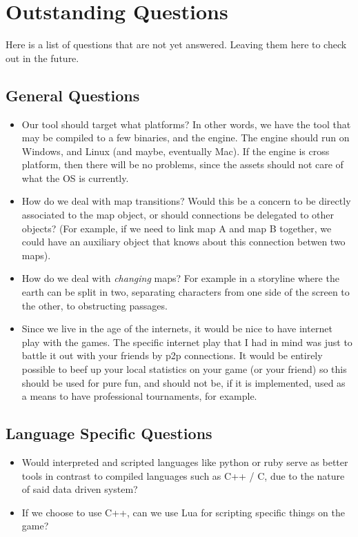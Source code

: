 \section{Outstanding Questions}

Here is a list of questions that are not yet answered. Leaving them here to
check out in the future.

\subsection{General Questions}

\begin{itemize}
  \item Our tool should target what platforms? In other words, we have the tool
    that may be compiled to a few binaries, and the engine. The engine should
    run on Windows, and Linux (and maybe, eventually Mac). If the engine is
    cross platform, then there will be no problems, since the assets should not
    care of what the OS is currently.

  \item How do we deal with map transitions? Would this be a concern to be
    directly associated to the map object, or should connections be delegated to
    other objects? (For example, if we need to link map A and map B together, we
      could have an auxiliary object that knows about this connection betwen two
    maps).

  \item How do we deal with \textit{changing} maps? For example in a storyline
    where the earth can be split in two, separating characters from one side of
    the screen to the other, to obstructing passages.

  \item Since we live in the age of the internets, it would be nice to have
    internet play with the games. The specific internet play that I had in mind
    was just to battle it out with your friends by p2p connections. It would be
    entirely possible to beef up your local statistics on your game (or your
    friend) so this should be used for pure fun, and should not be, if it is
    implemented, used as a means to have professional tournaments, for example.

\end{itemize}

\subsection{Language Specific Questions}

\begin{itemize}

\item Would interpreted and scripted languages like python or ruby serve as
better tools in contrast to compiled languages such as C++ / C, due to the
nature of said data driven system?

\item If we choose to use C++, can we use Lua for scripting specific things on
the game?

\end{itemize}

